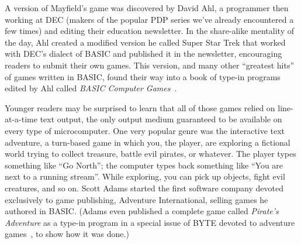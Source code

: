   

A version of Mayfield's game
was discovered by David Ahl, a programmer
then working at DEC (makers of the popular PDP series we've already
encountered a few times) and editing their education newsletter.
In the share-alike mentality of the day, Ahl created a modified
version he called Super Star Trek that worked with DEC's dialect of
BASIC and published it in the
newsletter, encouraging readers to submit their own games.
This version, and many other ``greatest hits'' of games written in
BASIC, found their way into a book of type-in programs edited by Ahl called \emph{BASIC
Computer Games}~\cite{basic_computer_games}.


Younger readers may be surprised to learn that all of those games
relied on line-at-a-time text output, the only
output medium guaranteed to be available on every type of
microcomputer.
One very popular genre was the interactive text adventure,
a turn-based game in which you, the
player, are exploring a fictional world trying to collect treasure,
battle evil pirates, or whatever.
The player types something like ``Go North''; the computer types
back something like ``You are next to a running stream''.  While
exploring, you can pick up objects, fight evil creatures, and so on.
Scott Adams
started the first software company devoted exclusively to game
publishing, Adventure International, selling games he authored in BASIC.
(Adams even published a complete game called \emph{Pirate's Adventure}
as a type-in program in a special issue of BYTE devoted to adventure
games~\cite{byte80:adventure}, to show how it was done.)


